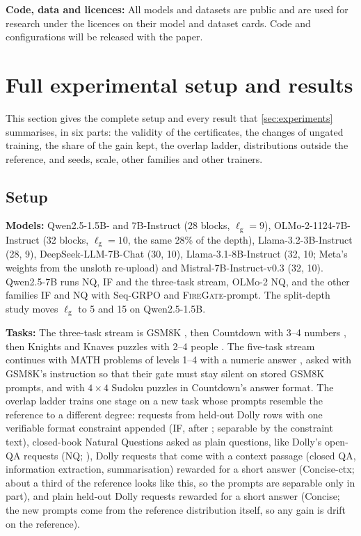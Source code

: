 \documentclass{article}
\theoremstyle{plain}
\theoremstyle{definition}
\theoremstyle{remark}
\renewcommand{\lg}{\ell_{\mathrm{g}}}
\newcommand{\methodp}{\textsc{FireGate}-prompt}
\begin{document}
\textbf{Code, data and licences:} All models and datasets are public and are used for research under the licences on
their model and dataset cards. Code and configurations will be released with the paper.

\section{Full experimental setup and results}
\label{app:full}

This section gives the complete setup and every result that \cref{sec:experiments} summarises, in six parts: the validity of the certificates, the changes of ungated training, the share of
the gain kept, the overlap ladder, distributions outside the reference, and seeds, scale, other families and other
trainers.

\subsection{Setup}
\label{sec:setup}\label{app:setup}

\textbf{Models:} Qwen2.5-1.5B- and 7B-Instruct (28 blocks, $\lg=9$), OLMo-2-1124-7B-Instruct (32 blocks, $\lg=10$,
the same 28\% of the depth), Llama-3.2-3B-Instruct (28, 9), DeepSeek-LLM-7B-Chat (30, 10), Llama-3.1-8B-Instruct (32,
10; Meta's weights from the unsloth re-upload) and Mistral-7B-Instruct-v0.3 (32, 10). Qwen2.5-7B runs NQ, IF and the
three-task stream, OLMo-2 NQ, and the other families IF and NQ with Seq-GRPO and \methodp{}. The split-depth study
moves $\lg$ to 5 and 15 on Qwen2.5-1.5B.

\textbf{Tasks:} The three-task stream is GSM8K \citep{cobbe2021gsm8k}, then Countdown with 3--4 numbers
\citep{pan2025tinyzero}, then Knights and Knaves puzzles with 2--4 people \citep{xie2024kk,xie2025logicrl}. The
five-task stream continues with MATH problems of levels 1--4 with a numeric answer \citep{hendrycks2021math}, asked
with GSM8K's instruction so that their gate must stay silent on stored GSM8K prompts, and with $4\times4$ Sudoku
puzzles in Countdown's answer format. The overlap ladder trains one stage on a new task whose prompts resemble
the reference to a different degree: requests from held-out Dolly rows with one verifiable format constraint
appended (IF, after \citealp{zhou2023ifeval}; separable by the constraint text), closed-book Natural Questions asked
as plain questions, like Dolly's open-QA requests (NQ; \citealp{kwiatkowski2019nq,lee2019latent}), Dolly requests that
come with a context passage (closed QA, information extraction, summarisation) rewarded for a short answer
(Concise-ctx; about a third of the reference looks like this, so the prompts are separable only in part), and plain
held-out Dolly requests rewarded for a short answer (Concise; the new prompts come from the reference distribution
itself, so any gain is drift on the reference).
\end{document}
